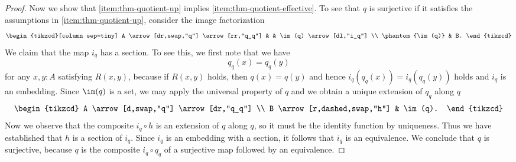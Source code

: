 \begin{proof}
  Now we show that \ref{item:thm-quotient-up} implies \ref{item:thm-quotient-effective}. To see that $q$ is surjective if it satisfies the assumptions in \ref{item:thm-quotient-up}, consider the image factorization
  \begin{equation*}
    \begin{tikzcd}[column sep=tiny]
      A \arrow[dr,swap,"q"] \arrow[rr,"q_q"] & & \im(q) \arrow[dl,"i_q"] \\
      \phantom{\im(q)} & B.
    \end{tikzcd}
  \end{equation*}
  We claim that the map $i_q$ has a section. To see this, we first note that we have
  \begin{equation*}
    q_q(x)=q_q(y)
  \end{equation*}
  for any $x,y:A$ satisfying $R(x,y)$, because if $R(x,y)$ holds, then $q(x)=q(y)$ and hence $i_q(q_q(x))=i_q(q_q(y))$ holds and $i_q$ is an embedding. Since $\im(q)$ is a set, we may apply the universal property of $q$ and we obtain a unique extension of $q_q$ along $q$
  \begin{equation*}
    \begin{tikzcd}
      A \arrow[d,swap,"q"] \arrow[dr,"q_q"] \\
      B \arrow[r,dashed,swap,"h"] & \im(q).
    \end{tikzcd}
  \end{equation*}
  Now we observe that the composite $i_q\circ h$ is an extension of $q$ along $q$, so it must be the identity function by uniqueness. Thus we have established that $h$ is a section of $i_q$. Since $i_q$ is an embedding with a section, it follows that $i_q$ is an equivalence. We conclude that $q$ is surjective, because $q$ is the composite $i_q\circ q_q$ of a surjective map followed by an equivalence.


\end{proof}
